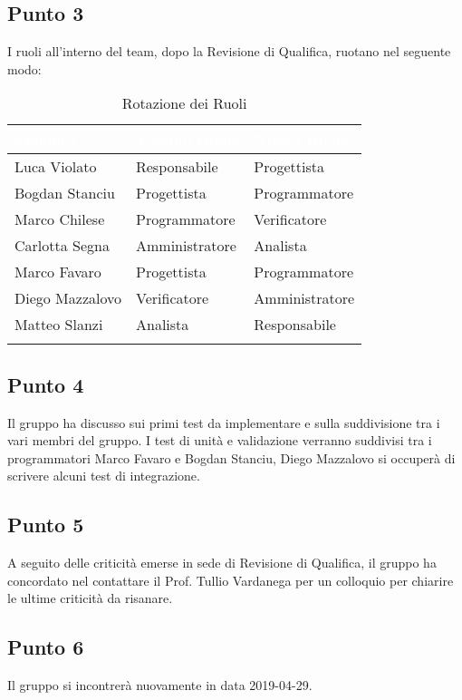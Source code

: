 \subsection{Punto 3}
I ruoli all'interno del team, dopo la Revisione di Qualifica, ruotano nel seguente modo:\\

\begin{center}
	\begin{longtable}[c]{|m{}|m{}|m{}|} 
		\hline
		\rowcolor{bluelogo}\textbf{\textcolor{white}{Membro}} & \textbf{\textcolor{white}{Vecchio Ruolo}} & \textbf{\textcolor{white}{Nuovo Ruolo}}\\
		\hline
		\hline
		Luca Violato & Responsabile & Progettista \\
		\hline
		\rowcolor{grigio}Bogdan Stanciu & Progettista & Programmatore \\
		\hline
		Marco Chilese & Programmatore & Verificatore\\
		\hline
		\rowcolor{grigio}Carlotta Segna & Amministratore & Analista\\
		\hline
		Marco Favaro & Progettista & Programmatore \\
		\hline
		\rowcolor{grigio} Diego Mazzalovo & Verificatore & Amministratore\\
		\hline
		Matteo Slanzi & Analista & Responsabile\\
		\hline
		\caption{Rotazione dei Ruoli}
	\end{longtable}

\end{center}

\subsection{Punto 4}
Il gruppo ha discusso sui primi test da implementare e sulla suddivisione tra i vari membri del gruppo. 
I test di unità e validazione verranno suddivisi tra i programmatori Marco Favaro e Bogdan Stanciu, Diego Mazzalovo si occuperà di scrivere alcuni test di integrazione.
	
\subsection{Punto 5}
A seguito delle criticità emerse in sede di Revisione di Qualifica, il gruppo ha concordato nel contattare il Prof. Tullio Vardanega per un colloquio per chiarire le ultime criticità da risanare.

\subsection{Punto 6}
Il gruppo si incontrerà nuovamente in data 2019-04-29.